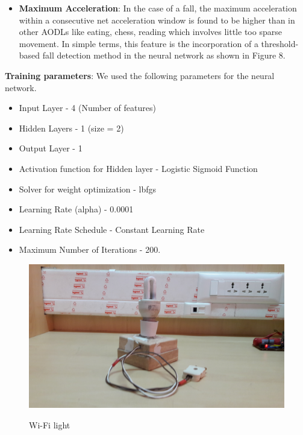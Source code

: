 \begin{enumerate}
\begin{itemize}
\item \textbf{Maximum Acceleration}: In the case of a fall, the maximum acceleration within a consecutive net acceleration window is found to be higher than in other AODLs like eating, chess, reading which involves little too sparse movement. In simple terms, this feature is the incorporation of a threshold-based fall detection method in the neural network as shown in Figure 8. \\

\end{itemize}

\textbf{Training parameters}: We used the following parameters for the neural network.

\begin{itemize}
\item Input Layer - 4 (Number of features)
\item Hidden Layers - 1 (size = 2)
\item Output Layer - 1 
\item Activation function for Hidden layer - Logistic Sigmoid Function
\item Solver for weight optimization - lbfgs
\item Learning Rate (alpha) - 0.0001
\item Learning Rate Schedule - Constant Learning Rate
\item Maximum Number of Iterations - 200.

\end{itemize}
\end{enumerate}

\begin{figure}[H]
\includegraphics[scale=0.08]{images/wifi_light.jpg}
\label{fig:9}
\caption{Wi-Fi light}
\end{figure}


